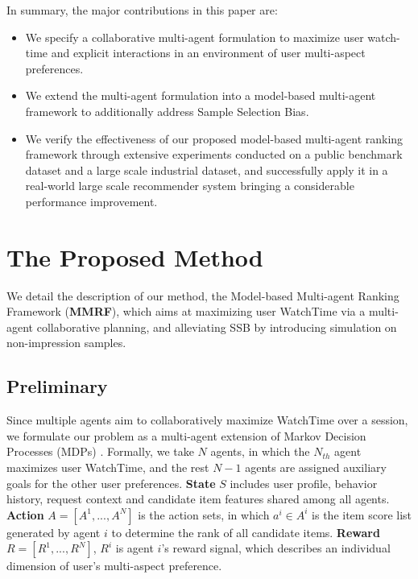 In summary, the major contributions in this paper are:
\begin{itemize}[leftmargin=10pt]
\setlength{\itemsep}{-1pt}
    \item We specify a collaborative multi-agent formulation to maximize user watch-time and explicit interactions in an environment of user multi-aspect preferences.
    \item We extend the multi-agent formulation into a model-based multi-agent framework to additionally address Sample Selection Bias. 
    \item We verify the effectiveness of our proposed model-based multi-agent ranking framework through extensive experiments conducted on a public benchmark dataset and a large scale industrial dataset, and successfully apply it in a real-world large scale recommender system bringing a considerable performance improvement.
\end{itemize}





\section{The Proposed Method}



We detail the description of our method, the Model-based Multi-agent Ranking Framework (\textbf{MMRF}), which aims at maximizing user WatchTime via a multi-agent collaborative planning, and alleviating SSB by introducing simulation on non-impression samples.

\subsection{Preliminary}
Since multiple agents aim to collaboratively maximize WatchTime over a session, we formulate our problem as a multi-agent extension of Markov Decision Processes (MDPs) \cite{MDP}. Formally, we take $N$ agents, in which the $N_{th}$ agent maximizes user WatchTime, and the rest $N-1$ agents are assigned auxiliary goals for the other user preferences. \textbf{State} $S$ includes user profile, behavior history, request context and candidate item features shared among all agents. \textbf{Action} $A = [A^1, ... , A^N]$ is the action sets, in which $a^i \in A^i$ is the item score list generated by agent $i$ to determine the rank of all candidate items. \textbf{Reward} $R = [R^1, ... , R^N]$, $R^i$ is agent $i$'s reward signal, which describes an individual dimension of user's multi-aspect preference.

